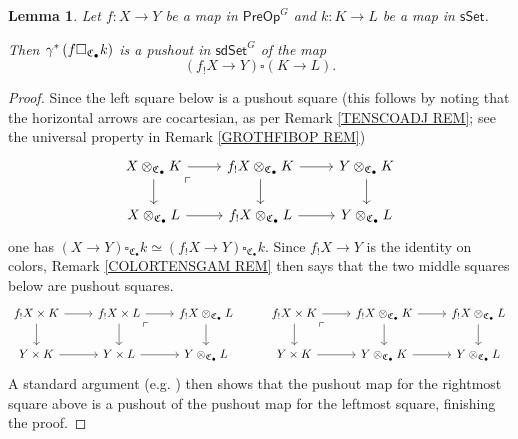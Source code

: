 \documentclass[a4paper,10pt
,draft
]{article}%
\numberwithin{equation}{section}
\numberwithin{figure}{section}
\newtheorem{lemma}[equation]{Lemma}%
\theoremstyle{definition} %
\newcommand{\1}{\ensuremath{\mathbbm 1}}%
\begin{document}
\begin{lemma}\label{OTIMSETPUSH LEM}
	Let $f\colon X \to Y$ be a map in $\mathsf{PreOp}^G$
	and $k \colon K \to L$ be a map in $\mathsf{sSet}$.

	Then $\gamma^{\**}\left(f \square_{\mathfrak{C}_{\bullet}} k\right)$
	is a pushout in $\mathsf{sdSet}^G$
	of the map
\[
	\left(f_! X \to Y\right)
	\square
	\left( K \to L \right).
\]
\end{lemma}


\begin{proof}
Since the left square below is a pushout square
(this follows by noting that the 
horizontal arrows are cocartesian, as per 
Remark \ref{TENSCOADJ REM};
see the universal property in Remark \ref{GROTHFIBOP REM})
\[
\begin{tikzcd}
	X \otimes_{\mathfrak{C}_{\bullet}} K \ar{r} \ar{d} 
	\arrow[dr, phantom, "\ulcorner", very near start]
&
	f_! X \otimes_{\mathfrak{C}_{\bullet}} K \ar{r} \ar{d} 
&
	Y \otimes_{\mathfrak{C}_{\bullet}} K \ar{d}
\\
	X \otimes_{\mathfrak{C}_{\bullet}} L \ar{r} 
&
	f_! X \otimes_{\mathfrak{C}_{\bullet}} L \ar{r} 
&
	Y \otimes_{\mathfrak{C}_{\bullet}} L
\end{tikzcd}
\]
one has
$(X \to Y) \square_{\mathfrak{C}_{\bullet}} k 
\simeq 
(f_!X \to Y) \square_{\mathfrak{C}_{\bullet}} k$.
Since $f_!X \to Y$ is the identity on colors,
Remark \ref{COLORTENSGAM REM} then says that 
the two middle squares below are pushout squares.
\[
\begin{tikzcd}
	f_! X \times K 
	\ar{r} \ar{d} 
&
	f_! X \times L
	\ar{r} \ar{d} 
	\arrow[dr, phantom, "\ulcorner", very near start] 
&
	f_! X \otimes_{\mathfrak{C}_{\bullet}} L
	\ar{d}
&
	f_! X \times K \ar{r} \ar{d} 
	\arrow[dr, phantom, "\ulcorner", very near start] 
&
	f_! X \otimes_{\mathfrak{C}_{\bullet}} K 
	\ar{r} \ar{d} 
&
	f_! X \otimes_{\mathfrak{C}_{\bullet}} L
	\ar{d}
\\
	Y \times K 
	\ar{r} 
&
	Y \times L
	\ar{r}
&
	Y \otimes_{\mathfrak{C}_{\bullet}} L
&
	Y \times K 
	\ar{r} 
&
	Y \otimes_{\mathfrak{C}_{\bullet}} K
	\ar{r}
&
	Y \otimes_{\mathfrak{C}_{\bullet}} L
\end{tikzcd}
\]
A standard argument
(e.g. \cite[Obs. 5.1]{RV14})
then shows that the pushout map for the rightmost square above is a pushout of the pushout map for the leftmost square, 
finishing the proof.	
\end{proof}
\end{document}

